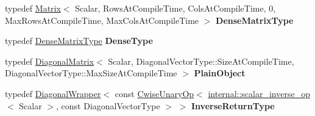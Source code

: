 \begin{DoxyCompactItemize}
\item 
\mbox{\label{class_eigen_1_1_diagonal_base_a5b03ccd914288064b6db84176fde6643}} 
typedef \mbox{\hyperlink{class_eigen_1_1_matrix}{Matrix}}$<$ Scalar, Rows\+At\+Compile\+Time, Cols\+At\+Compile\+Time, 0, Max\+Rows\+At\+Compile\+Time, Max\+Cols\+At\+Compile\+Time $>$ {\bfseries Dense\+Matrix\+Type}
\item 
\mbox{\label{class_eigen_1_1_diagonal_base_ab57e4c5bcb838b2fbfb7bcc6c828e3b1}} 
typedef \mbox{\hyperlink{class_eigen_1_1_matrix}{Dense\+Matrix\+Type}} {\bfseries Dense\+Type}
\item 
\mbox{\label{class_eigen_1_1_diagonal_base_a12790179b6a63c133521233851728448}} 
typedef \mbox{\hyperlink{class_eigen_1_1_diagonal_matrix}{Diagonal\+Matrix}}$<$ Scalar, Diagonal\+Vector\+Type\+::\+Size\+At\+Compile\+Time, Diagonal\+Vector\+Type\+::\+Max\+Size\+At\+Compile\+Time $>$ {\bfseries Plain\+Object}
\item 
\mbox{\label{class_eigen_1_1_diagonal_base_abf3d0ad516e702c213e11f28bae2eb14}} 
typedef \mbox{\hyperlink{class_eigen_1_1_diagonal_wrapper}{Diagonal\+Wrapper}}$<$ const \mbox{\hyperlink{class_eigen_1_1_cwise_unary_op}{Cwise\+Unary\+Op}}$<$ \mbox{\hyperlink{struct_eigen_1_1internal_1_1scalar__inverse__op}{internal\+::scalar\+\_\+inverse\+\_\+op}}$<$ Scalar $>$, const Diagonal\+Vector\+Type $>$ $>$ {\bfseries Inverse\+Return\+Type}
\end{DoxyCompactItemize}
